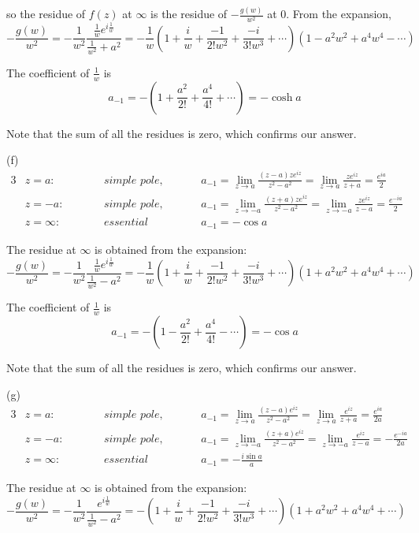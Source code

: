 \documentclass[a4paper]{article}
\begin{document}
so the residue of $f(z)$ at $\infty$ is the residue of $-\frac{g(w)}{w^2}$ at $0$. From the expansion,
\[
-\frac{g(w)}{w^2}=
-\frac{1}{w^2}\frac{\frac{1}{w}e^{i\frac{1}{w}}}{\frac{1}{w^2}+a^2}=-\frac{1}{w}\left(1+\frac{i}{w}+\frac{-1}{2!w^2}+\frac{-i}{3!w^3}+\cdots \right)\left(1-a^2w^2+a^4w^4-\cdots \right)
\]

The coefficient of $\frac{1}{w}$ is 
\[
a_{-1}=-\left(1+\frac{a^2}{2!}+\frac{a^4}{4!}+\cdots \right)=-\cosh a
\]

Note that the sum of all the residues is zero, which confirms our answer.
\medskip

(f)
\begin{alignat*}{3}
    & z=a:\qquad && \textit{simple pole,}\qquad && a_{-1}=\lim_{z\to a}\frac{(z-a)ze^{iz}}{z^2-a^2}=\lim_{z\to a}\frac{ze^{iz}}{z+a}=\frac{e^{ia}}{2}\\
    & z=-a:\qquad && \textit{simple pole,}\qquad && a_{-1}=\lim_{z\to -a}\frac{(z+a)ze^{iz}}{z^2-a^2}=\lim_{z\to -a}\frac{ze^{iz}}{z-a}=\frac{e^{-ia}}{2}\\
    & z=\infty:\qquad && \textit{essential singularity,}\qquad && a_{-1}=-\cos a
\end{alignat*}

The residue at $\infty$ is obtained from the expansion:
\[
-\frac{g(w)}{w^2}=
-\frac{1}{w^2}\frac{\frac{1}{w}e^{i\frac{1}{w}}}{\frac{1}{w^2}-a^2}=-\frac{1}{w}\left(1+\frac{i}{w}+\frac{-1}{2!w^2}+\frac{-i}{3!w^3}+\cdots \right)\left(1+a^2w^2+a^4w^4+\cdots \right)
\]

The coefficient of $\frac{1}{w}$ is 
\[
a_{-1}=-\left(1-\frac{a^2}{2!}+\frac{a^4}{4!}-\cdots \right)=-\cos a
\]

Note that the sum of all the residues is zero, which confirms our answer.
\medskip

(g)
\begin{alignat*}{3}
    & z=a:\qquad && \textit{simple pole,}\qquad && a_{-1}=\lim_{z\to a}\frac{(z-a)e^{iz}}{z^2-a^2}=\lim_{z\to a}\frac{e^{iz}}{z+a}=\frac{e^{ia}}{2a}\\
    & z=-a:\qquad && \textit{simple pole,}\qquad && a_{-1}=\lim_{z\to -a}\frac{(z+a)e^{iz}}{z^2-a^2}=\lim_{z\to -a}\frac{e^{iz}}{z-a}=-\frac{e^{-ia}}{2a}\\
    & z=\infty:\qquad && \textit{essential singularity,}\qquad && a_{-1}=-\frac{i\sin a}{a}
\end{alignat*}

The residue at $\infty$ is obtained from the expansion:
\[
-\frac{g(w)}{w^2}=
-\frac{1}{w^2}\frac{e^{i\frac{1}{w}}}{\frac{1}{w^2}-a^2}=-\left(1+\frac{i}{w}+\frac{-1}{2!w^2}+\frac{-i}{3!w^3}+\cdots \right)\left(1+a^2w^2+a^4w^4+\cdots \right)
\]
\end{document}

